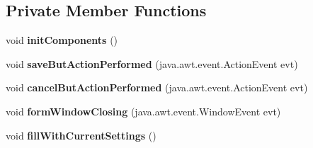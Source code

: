 \subsection*{Private Member Functions}
\begin{DoxyCompactItemize}
\item 
void {\bfseries init\+Components} ()\hypertarget{classsoftmakerjava_1_1_settings_panel_a3fdde2a8e41a3a1fa866cdcd17ba1b02}{}\label{classsoftmakerjava_1_1_settings_panel_a3fdde2a8e41a3a1fa866cdcd17ba1b02}

\item 
void {\bfseries save\+But\+Action\+Performed} (java.\+awt.\+event.\+Action\+Event evt)\hypertarget{classsoftmakerjava_1_1_settings_panel_a605332892182ba820f9fba60252c115e}{}\label{classsoftmakerjava_1_1_settings_panel_a605332892182ba820f9fba60252c115e}

\item 
void {\bfseries cancel\+But\+Action\+Performed} (java.\+awt.\+event.\+Action\+Event evt)\hypertarget{classsoftmakerjava_1_1_settings_panel_ad9159a73ff79ff7dd2c7a56b45cf99b6}{}\label{classsoftmakerjava_1_1_settings_panel_ad9159a73ff79ff7dd2c7a56b45cf99b6}

\item 
void {\bfseries form\+Window\+Closing} (java.\+awt.\+event.\+Window\+Event evt)\hypertarget{classsoftmakerjava_1_1_settings_panel_ac4fe57308cf72295897e4fa2b6be46b8}{}\label{classsoftmakerjava_1_1_settings_panel_ac4fe57308cf72295897e4fa2b6be46b8}

\item 
void {\bfseries fill\+With\+Current\+Settings} ()\hypertarget{classsoftmakerjava_1_1_settings_panel_a485d2880274c5c7c0bb5bf6e829278b5}{}\label{classsoftmakerjava_1_1_settings_panel_a485d2880274c5c7c0bb5bf6e829278b5}

\end{DoxyCompactItemize}
